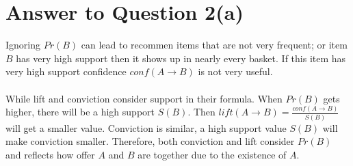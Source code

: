 \documentclass[11pt]{article}
\begin{document}
\pagebreak[4]
\section*{Answer to Question 2(a)}
Ignoring $Pr(B)$ can lead to recommen items that are not very frequent;
or item $B$ has very high support then it shows up in nearly every basket.
If this item has very high support confidence $conf(A\rightarrow B)$ is not very useful.\\
\\
While lift and conviction consider support in their formula. When $Pr(B)$ gets higher,
there will be a high support $S(B)$. Then $lift(A\rightarrow B) = \frac{conf(A\rightarrow B)}{S(B)}$
will get a smaller value. Conviction is similar, a high support value $S(B)$ will make conviction smaller.
Therefore, both conviction and lift consider $Pr(B)$ and reflects how offer $A$ and $B$ are together due to the existence of $A$.

\pagebreak[4]
\end{document}
